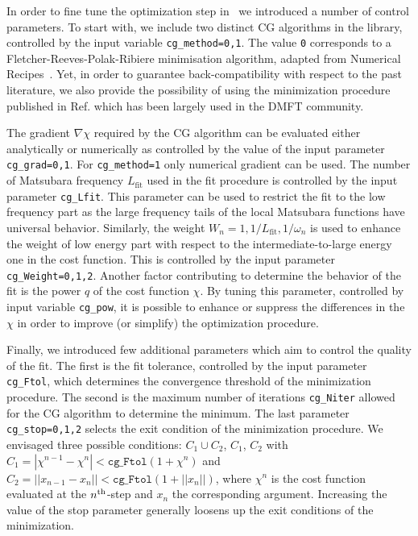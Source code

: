 \documentclass[edipack2.tex]{subfiles}
\begin{document}
In order to fine tune the optimization step in \NAME\ we
introduced a number of control parameters. To start with, we include
two distinct CG algorithms in the library, controlled by the input variable
\texttt{cg\_method=0,1}. The value \texttt{0} corresponds to a
Fletcher-Reeves-Polak-Ribiere minimisation algorithm, adapted from
Numerical Recipes~\cite{NumRec77}. Yet, in order to guarantee
back-compatibility with respect to the past literature, we also provide the
possibility of using the minimization procedure published in
Ref. which has been largely used in the DMFT
community.

The gradient $\nabla\chi$ required by the CG algorithm can be
evaluated either analytically or numerically as
controlled by the value of the input parameter \texttt{cg\_grad=0,1}. For
\texttt{cg\_method=1} only numerical gradient can be used.
The number of Matsubara frequency $L_\mathrm{fit}$ used in the fit procedure
is controlled  by the input parameter \texttt{cg\_Lfit}.
This parameter can be used to restrict the fit to the low frequency
part as the large frequency tails of the local Matsubara functions
have universal behavior.
Similarly, the weight  $W_n=1,1/L_\mathrm{fit},1/\omega_n$ is used to
enhance the weight of low energy part with respect to the
intermediate-to-large energy one in the cost function.
This is controlled by the input parameter \texttt{cg\_Weight=0,1,2}.
Another  factor contributing to determine the behavior
of the fit is the power $q$ of the cost function $\chi$. By tuning
this parameter, controlled by input variable \texttt{cg\_pow}, it is
possible to enhance or suppress the differences in the $\chi$ in order
to improve (or simplify) the optimization procedure.  

Finally, we introduced few additional parameters which aim to
control the quality of the fit. The first is the fit tolerance,
controlled by the input parameter \texttt{cg\_Ftol}, which
determines the convergence threshold of the minimization procedure.
The second is the maximum number of iterations \texttt{cg\_Niter}
allowed for the CG algorithm to determine the minimum.
The last parameter \texttt{cg\_stop=0,1,2} selects the exit
condition of the minimization procedure. We envisaged  three
possible conditions: $C_1\cup C_2$, $C_1$, $C_2$ with 
$C_1=|\chi^{n-1} -\chi^n|<\mathtt{cg\_Ftol}(1+\chi^n)$ and
$C_2=||x_{n-1} -x_n||<\mathtt{cg\_Ftol}(1+||x_n||)$, where $\chi^n$
is the cost function evaluated at the $n^{\rm th}$-step and $x_n$
the corresponding argument. Increasing the value of the stop
parameter generally loosens up the exit conditions of the minimization.   
\end{document}
